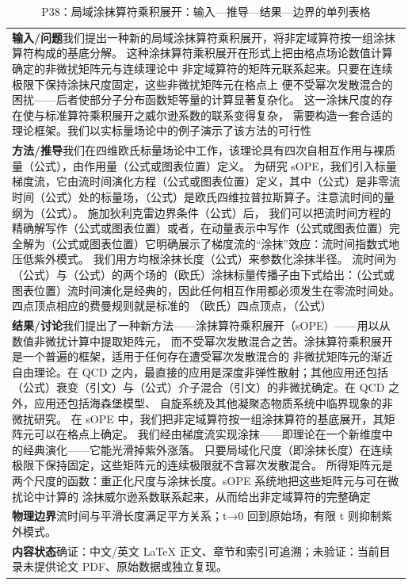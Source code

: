 \documentclass[UTF8,11pt,oneside]{ctexbook}
\begin{document}
\begin{table}[htbp]
  \centering
  \caption*{P38：局域涂抹算符乘积展开：输入—推导—结果—边界的单列表格}
  \small
  \begin{tabular}{@{}p{}@{}}
    \toprule
    \textbf{输入/问题}\quad 我们提出一种新的局域涂抹算符乘积展开，将非定域算符按一组涂抹算符构成的基底分解。 这种涂抹算符乘积展开在形式上把由格点场论数值计算确定的非微扰矩阵元与连续理论中 非定域算符的矩阵元联系起来。只要在连续极限下保持涂抹尺度固定，这些非微扰矩阵元在格点上 便不受幂次发散混合的困扰——后者使部分子分布函数矩等量的计算显著复杂化。 这一涂抹尺度的存在使与标准算符乘积展开之威尔逊系数的联系变得复杂， 需要构造一套合适的理论框架。我们以实标量场论中的例子演示了该方法的可行性 \\
    \textbf{方法/推导}\quad 我们在四维欧氏标量场论中工作，该理论具有四次自相互作用与裸质量（公式），由作用量（公式或图表位置）定义。 为研究 sOPE，我们引入标量梯度流，它由流时间演化方程（公式或图表位置）定义，其中（公式）是非零流时间（公式）处的标量场，（公式）是欧氏四维拉普拉斯算子。注意流时间的量纲为（公式）。 施加狄利克雷边界条件（公式）后， 我们可以把流时间方程的精确解写作（公式或图表位置）或者，在动量表示中写作（公式或图表位置）完全解为（公式或图表位置）它明确展示了梯度流的``涂抹''效应：流时间指数式地压低紫外模式。 我们用方均根涂抹长度（公式）来参数化涂抹半径。 流时间为（公式）与（公式）的两个场的（欧氏）涂抹标量传播子由下式给出：（公式或图表位置）流时间演化是经典的，因此任何相互作用都必须发生在零流时间处。四点顶点相应的费曼规则就是标准的 （欧氏）四点顶点，（公式） \\
    \textbf{结果/讨论}\quad 我们提出了一种新方法——涂抹算符乘积展开（sOPE）——用以从数值非微扰计算中提取矩阵元， 而不受幂次发散混合之苦。涂抹算符乘积展开是一个普遍的框架，适用于任何存在遭受幂次发散混合的 非微扰矩阵元的渐近自由理论。在 QCD 之内，最直接的应用是深度非弹性散射；其他应用还包括（公式）衰变（引文）与（公式）介子混合（引文）的非微扰确定。在 QCD 之外，应用还包括海森堡模型、 自旋系统及其他凝聚态物质系统中临界现象的非微扰研究。 在 sOPE 中，我们把非定域算符按一组涂抹算符的基底展开，其矩阵元可以在格点上确定。 我们经由梯度流实现涂抹——即理论在一个新维度中的经典演化——它能光滑掉紫外涨落。 只要局域化尺度（即涂抹长度）在连续极限下保持固定，这些矩阵元的连续极限就不含幂次发散混合。 所得矩阵元是两个尺度的函数：重正化尺度与涂抹长度。sOPE 系统地把这些矩阵元与可在微扰论中计算的 涂抹威尔逊系数联系起来，从而给出非定域算符的完整确定 \\
    \textbf{物理边界}\quad 流时间与平滑长度满足平方关系；t→0 回到原始场，有限 t 则抑制紫外模式。 \\
    \textbf{内容状态}\quad 确证：中文/英文 LaTeX 正文、章节和索引可追溯；未验证：当前目录未提供论文 PDF、原始数据或独立复现。 \\
    \bottomrule
  \end{tabular}
\end{table}
\end{document}
